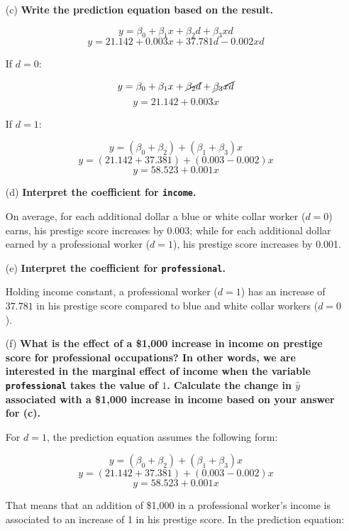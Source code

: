 \documentclass[12pt,letterpaper]{article}
\begin{document}
\begin{enumerate}
	\newpage
	
	\item [(c)]
	\textbf{Write the prediction equation based on the result.}
	
		$$y = \beta_0 + \beta_1 x + \beta_2 d + \beta_3 xd$$
		$$y = 21.142 + 0.003x + 37.781d - 0.002xd$$
		
		\begin{center}
			If $d = 0$:
		\end{center}
		$$y = \beta_0 + \beta_1 x + \cancel{\beta_2 d} + \cancel{\beta_3 xd}$$
		$$y = 21.142 + 0.003x$$
		
		\begin{center}
			If $d = 1$:
		\end{center}
		$$y = (\beta_0 + \beta_2) + (\beta_1 + \beta_3)x$$
		$$y = (21.142 + 37.381) + (0.003 - 0.002)x$$
		$$y = 58.523 + 0.001x$$
	
	\item [(d)]
	\textbf{Interpret the coefficient for \texttt{income}.}
	
		On average, for each additional dollar a blue or white collar worker ($d=0$) earns, his prestige score increases by 0.003; while for each additional dollar earned by a professional worker ($d=1$), his prestige score increases by 0.001. 
	
	\item [(e)]
	\textbf{Interpret the coefficient for \texttt{professional}.}
	
		Holding income constant, a professional worker ($d=1$) has an increase of $37.781$ in his prestige score compared to blue and white collar workers ($d=0$).
	
	\item [(f)]
	\textbf{What is the effect of a \$1,000 increase in income on prestige score for professional occupations? In other words, we are interested in the marginal effect of income when the variable \texttt{professional} takes the value of $1$. Calculate the change in $\hat{y}$ associated with a \$1,000 increase in income based on your answer for (c).}
		
		For $d = 1$, the prediction equation assumes the following form:
		
		$$y = (\beta_0 + \beta_2) + (\beta_1 + \beta_3)x$$
		$$y = (21.142 + 37.381) + (0.003 - 0.002)x$$
		$$y = 58.523 + 0.001x$$
		
		That means that an addition of \$1,000 in a professional worker's income is associated to an increase of 1 in his prestige score. In the prediction equation:
		

\end{enumerate}
\end{document}
